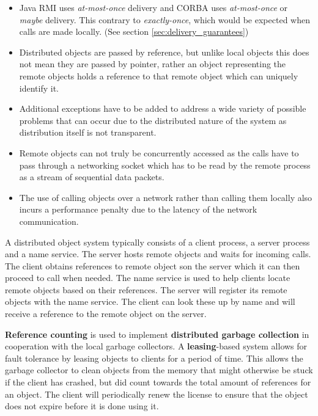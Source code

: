 \documentclass[a4paper]{article}
\begin{document}
\begin{itemize}
\item Java RMI uses \textit{at-most-once} delivery and CORBA uses \textit{at-most-once} or \textit{maybe} delivery. This contrary to \textit{exactly-once}, which would be expected when calls are made locally. (See section \ref{sec:delivery_guarantees})
\item Distributed objects are passed by reference, but unlike local objects this does not mean they are passed by pointer, rather an object representing the remote objects holds a reference to that remote object which can uniquely identify it.
\item Additional exceptions have to be added to address a wide variety of possible problems that can occur due to the distributed nature of the system as distribution itself is not transparent.
\item Remote objects can not truly be concurrently accessed as the calls have to pass through a networking socket which has to be read by the remote process as a stream of sequential data packets.
\item The use of calling objects over a network rather than calling them locally also incurs a performance penalty due to the latency of the network communication.
\end{itemize}

A distributed object system typically consists of a client process, a server process and a name service. The server hosts remote objects and waits for incoming calls. The client obtains references to remote object son the server which it can then proceed to call when needed. The name service is used to help clients locate remote objects based on their references. The server will register its remote objects with the name service. The client can look these up by name and will receive a reference to the remote object on the server.

\textbf{Reference counting} is used to implement \textbf{distributed garbage collection} in cooperation with the local garbage collectors. A \textbf{leasing}-based system allows for fault tolerance by leasing objects to clients for a period of time. This allows the garbage collector to clean objects from the memory that might otherwise be stuck if the client has crashed, but did count towards the total amount of references for an object. The client will periodically renew the license to ensure that the object does not expire before it is done using it.

\newpage
\end{document}
